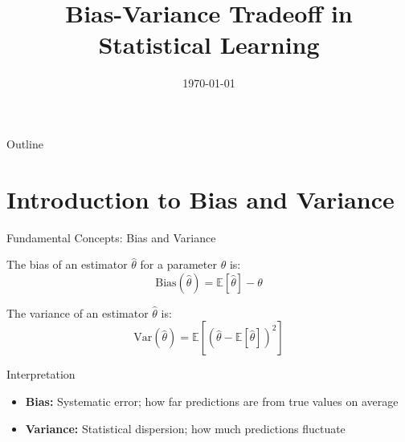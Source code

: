 \documentclass{beamer}
\title{Bias-Variance Tradeoff in Statistical Learning}
\author{}
\date{\today}
\begin{document}
\begin{frame}
  \titlepage
\end{frame}

\begin{frame}{Outline}
  \tableofcontents
\end{frame}

\section{Introduction to Bias and Variance}

\begin{frame}{Fundamental Concepts: Bias and Variance}
  \begin{definition}[Bias]
    The bias of an estimator $\hat{\theta}$ for a parameter $\theta$ is:
    \[
    \text{Bias}(\hat{\theta}) = \mathbb{E}[\hat{\theta}] - \theta
    \]
  \end{definition}
  
  \begin{definition}[Variance]
    The variance of an estimator $\hat{\theta}$ is:
    \[
    \text{Var}(\hat{\theta}) = \mathbb{E}[(\hat{\theta} - \mathbb{E}[\hat{\theta}])^2]
    \]
  \end{definition}
  
  \begin{block}{Interpretation}
    \begin{itemize}
      \item \textbf{Bias:} Systematic error; how far predictions are from true values on average
      \item \textbf{Variance:} Statistical dispersion; how much predictions fluctuate
    \end{itemize}
  \end{block}
\end{frame}
\end{document}
